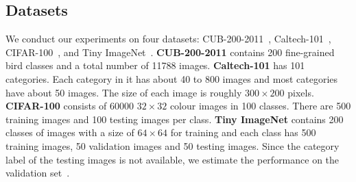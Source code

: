 \documentclass[10pt,twocolumn,letterpaper]{article}
\begin{document}
\subsection{Datasets}
We conduct our experiments on four datasets: CUB-200-2011~\cite{wah2011caltech}, Caltech-101~\cite{fei2004learning}, CIFAR-100~\cite{krizhevsky2009learning}, and Tiny ImageNet~\cite{le2015tiny}.
\textbf{CUB-200-2011} contains 200 fine-grained bird classes and a total number of 11788 images. 
\textbf{Caltech-101} has 101 categories. Each category in it has about 40 to 800 images and most categories have about 50 images. The size of each image is roughly $300\times200$ pixels.
\textbf{CIFAR-100} consists of 60000 $32\times32$ colour images in 100 classes. There are 500 training images and 100 testing images per class.
\textbf{Tiny ImageNet} contains 200 classes of images with a size of $64\times64$ for training and each class has 500 training images, 50 validation images and 50 testing images. Since the category label of the testing images is not available, we estimate the performance on the validation set~\cite{liumore}. 
\end{document}
